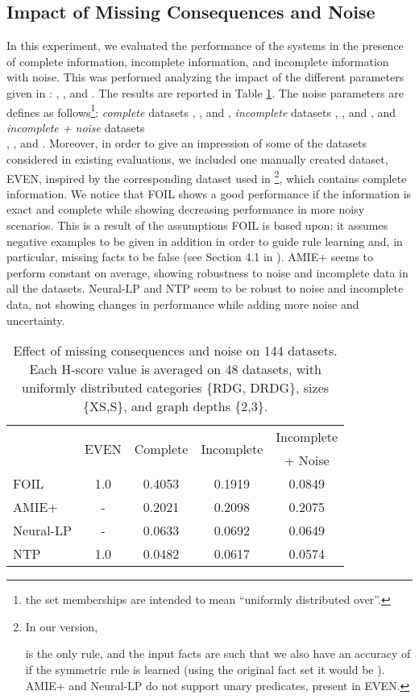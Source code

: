 \documentclass[letterpaper]{article} \usepackage{aaai20}  \usepackage{times}  \usepackage{helvet} \usepackage{courier}  \usepackage[hyphens]{url}  \usepackage{graphicx} \urlstyle{rm} \def\UrlFont{\rm}  \usepackage{graphicx}  \frenchspacing  \setlength{\pdfpagewidth}{8.5in}  \setlength{\pdfpageheight}{11in}  \usepackage{amsthm}
\theoremstyle{definition}
\newcommand{\tool}{\text{RuDaS}\xspace}
\begin{document}
\subsection{Impact of Missing Consequences and Noise}\label{sec:exp_noise}
In this experiment, we evaluated the performance of the systems in the presence of complete information, incomplete information, and incomplete information with noise. This was performed analyzing the impact of the different parameters given in \tool: , , and . The results are reported in Table \ref{tab:results_2}. The noise parameters are defines as follows\footnote{the set memberships are intended to mean ``uniformly distributed over''.}: 
{\it complete} datasets , , and , 
{\it incomplete} datasets , , and , and 
{\it incomplete + noise} datasets  \\, , and . 
Moreover, in order to give an impression of some of the datasets considered in existing evaluations, we included one manually created dataset, EVEN, inspired by the corresponding dataset used in  \cite{EGre-jair18:learning-explanatory-rules}\footnote{In our version, 
 
is the only rule,
and the input facts are such that we also have an  accuracy of  if the symmetric rule  is learned (using the original fact set it would be ). AMIE+ and Neural-LP do not support unary predicates, present in EVEN.}, which contains complete information.
We notice that FOIL shows a good performance if the information is exact and complete while showing decreasing performance in more noisy scenarios. 
This is a result of the assumptions FOIL is based upon: it assumes negative examples to be given in addition in order to guide rule learning and, in particular, missing facts to be false (see Section 4.1 in \cite{Quinlan-ML90:foil}).
AMIE+ seems to perform constant on average, showing
robustness to noise and incomplete data in all the datasets.
Neural-LP and NTP seem to be robust to noise and incomplete data, not showing changes in performance while adding more noise and uncertainty.
\begin{table}[h!]
    \centering
\small
    \begin{tabular}{lcccc}
    \toprule
&\multirow{2}{*}{EVEN} &  \multirow{2}{*}{Complete} & \multirow{2}{*}{Incomplete}& Incomplete \\& & & & + Noise \\
     \midrule
     FOIL & 1.0 & 0.4053 &	0.1919 &	0.0849 \\
     AMIE+ & - &  0.2021 &	0.2098 &	0.2075 \\
     Neural-LP&  - & 0.0633 &	0.0692 &	0.0649 \\
     NTP  & 1.0 & 0.0482 &	0.0617 &	0.0574 \\
     \bottomrule
    \end{tabular}
    \caption{Effect of missing consequences and noise on 144 datasets. Each H-score value is averaged on 48 datasets, with uniformly distributed categories  \{RDG, DRDG\}, sizes  \{XS,S\}, and graph depths  \{2,3\}.}
    \label{tab:results_2}
\end{table}
\end{document}
